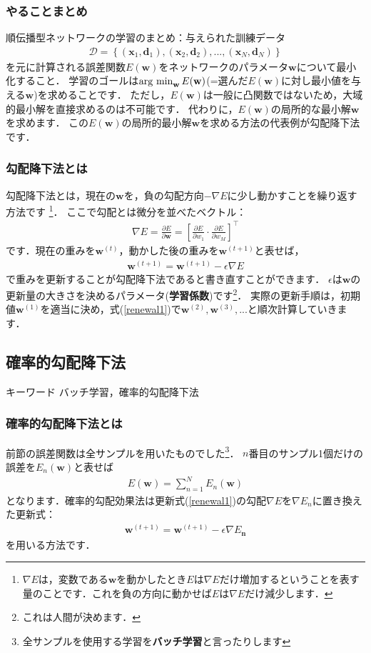 \documentclass[a4paper,10pt]{jsarticle}
\theoremstyle{definition}
\newcommand{\eq}[1]{\begin{align}#1\end{align}}
\newcommand{\argmin}{\mathop{\rm arg~min}}
\begin{document}
\subsubsection*{やることまとめ}
順伝播型ネットワークの学習のまとめ：与えられた訓練データ
\eq{\mathcal{D}=\left\{(\mathbf{x}_1,\mathbf{d}_1),(\mathbf{x}_2,\mathbf{d}_2),...,(\mathbf{x}_N,\mathbf{d}_N)\right\}}
を元に計算される誤差関数$E(\mathbf{w})$をネットワークのパラメータ$\mathbf{w}$について最小化すること．
学習のゴールは$\argmin_\mathbf{w}E(\mathbf{w})$(=選んだ$E(\mathbf{w})$に対し最小値を与える$\mathbf{w}$)を求めることです．
ただし，$E(\mathbf{w})$は一般に凸関数ではないため，大域的最小解を直接求めるのは不可能です．
代わりに，$E(\mathbf{w})$の局所的な最小解$\mathbf{w}$を求めます．
この$E(\mathbf{w})$の局所的最小解$\mathbf{w}$を求める方法の代表例が勾配降下法です．
\subsubsection*{勾配降下法とは}
勾配降下法とは，現在の$\mathbf{w}$を，負の勾配方向$-\nabla E$に少し動かすことを繰り返す方法です
\footnote{$\nabla E$は，変数である$\mathbf{w}$を動かしたとき$E$は$\nabla E$だけ増加するということを表す量のことです．これを負の方向に動かせば$E$は$\nabla E$だけ減少します．}．
ここで勾配とは微分を並べたベクトル：
\eq{\nabla E=\frac{\partial E}{\partial\mathbf{w}}=\left[\frac{\partial E}{\partial w_1}\cdot\frac{\partial E}{\partial w_M}\right]^\top}
です．現在の重みを$\mathbf{w}^{(t)}$，動かした後の重みを$\mathbf{w}^{(t+1)}$と表せば，
\eq{\mathbf{w}^{(t+1)}=\mathbf{w}^{(t+1)}-\epsilon\nabla E\label{renewal1}}
で重みを更新することが勾配降下法であると書き直すことができます．
$\epsilon$は$\mathbf{w}$の更新量の大きさを決めるパラメータ({\bf 学習係数})です\footnote{これは人間が決めます．}．
実際の更新手順は，初期値$\mathbf{w}^{(1)}$を適当に決め，式(\ref{renewal1})で$\mathbf{w}^{(2)},\mathbf{w}^{(3)},...$と順次計算していきます．
%
\subsection{確率的勾配降下法}
\begin{itembox}[l]{キーワード}
バッチ学習，確率的勾配降下法
\end{itembox}
\subsubsection*{確率的勾配降下法とは}
前節の誤差関数は全サンプルを用いたものでした\footnote{全サンプルを使用する学習を\textbf{バッチ学習}と言ったりします}．
$n$番目のサンプル1個だけの誤差を$E_n(\mathbf{w})$と表せば
\eq{E(\mathbf{w})=\sum_{n=1}^NE_n(\mathbf{w})}
となります．確率的勾配効果法は更新式(\ref{renewal1})の勾配$\nabla E$を$\nabla E_n$に置き換えた更新式：
\eq{\mathbf{w}^{(t+1)}=\mathbf{w}^{(t+1)}-\epsilon\nabla E_\mathbf{n}\label{renewal2}}
を用いる方法です．
\end{document}

